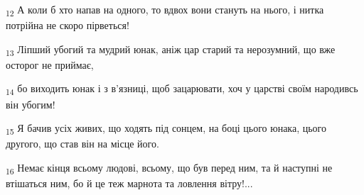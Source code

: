 \begin{tcolorbox}
\textsubscript{12} А коли б хто напав на одного, то вдвох вони стануть на нього, і нитка потрійна не скоро пірветься!
\end{tcolorbox}
\begin{tcolorbox}
\textsubscript{13} Ліпший убогий та мудрий юнак, аніж цар старий та нерозумний, що вже осторог не приймає,
\end{tcolorbox}
\begin{tcolorbox}
\textsubscript{14} бо виходить юнак і з в'язниці, щоб зацарювати, хоч у царстві своїм народивсь він убогим!
\end{tcolorbox}
\begin{tcolorbox}
\textsubscript{15} Я бачив усіх живих, що ходять під сонцем, на боці цього юнака, цього другого, що став він на місце його.
\end{tcolorbox}
\begin{tcolorbox}
\textsubscript{16} Немає кінця всьому людові, всьому, що був перед ним, та й наступні не втішаться ним, бо й це теж марнота та ловлення вітру!...
\end{tcolorbox}
